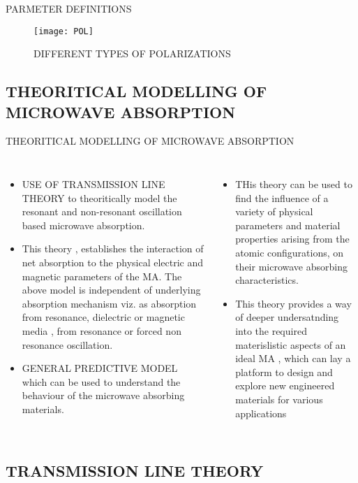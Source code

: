 \documentclass[11pt,aspect ratio=169]{beamer}
\begin{document}
\begin{frame}[t,allowframebreaks]{PARMETER DEFINITIONS}
	\begin{figure}
		\tiny
		\centering
		\texttt{[image: POL]}
		\caption{DIFFERENT TYPES OF POLARIZATIONS\protect \cite{booke}}
		\label{fig:pol}
	\end{figure}

	\end{frame}
\subsection{THEORITICAL MODELLING OF MICROWAVE ABSORPTION}
\begin{frame}{THEORITICAL MODELLING OF MICROWAVE ABSORPTION}
\begin{columns}[]

\begin{itemize}
	\item USE OF TRANSMISSION LINE THEORY to theoritically model the resonant and non-resonant oscillation based microwave absorption.
	\item This theory , establishes the interaction of net absorption to the physical electric and magnetic parameters of the MA.
The above model is independent of underlying absorption mechanism viz. as absorption from resonance, dielectric or magnetic media , from resonance or forced non resonance oscillation.
\item GENERAL PREDICTIVE MODEL which can be used to understand the behaviour of the microwave absorbing materials.
\end{itemize}
\begin{itemize}

\item THis theory can be used to find the influence of a variety of physical parameters and material properties arising from the atomic configurations, on their microwave absorbing characteristics.
\item This theory provides a way of deeper undersatnding into the required materislistic aspects of an ideal MA , which can lay a platform to design and explore new engineered materials for various applications
\end{itemize}

\end{columns}
\end{frame}
\subsection{TRANSMISSION LINE THEORY}
\end{document}
